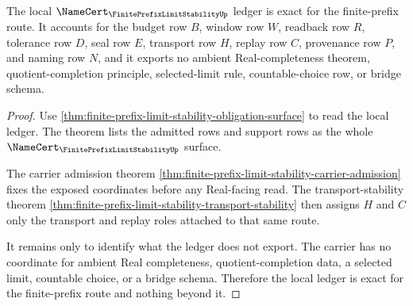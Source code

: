 \begin{theorem}
\label{thm:finite-prefix-limit-stability-ledger-exactness}
The local $\NameCert_{\FinitePrefixLimitStabilityUp}$ ledger is exact for the finite-prefix route. It accounts for the budget row $B$, window row $W$, readback row $R$, tolerance row $D$, seal row $E$, transport row $H$, replay row $C$, provenance row $P$, and naming row $N$, and it exports no ambient Real-completeness theorem, quotient-completion principle, selected-limit rule, countable-choice row, or bridge schema.
\end{theorem}
\begin{proof}
Use \autoref{thm:finite-prefix-limit-stability-obligation-surface} to read the local ledger. The theorem lists the admitted rows and support rows as the whole $\NameCert_{\FinitePrefixLimitStabilityUp}$ surface.

The carrier admission theorem \autoref{thm:finite-prefix-limit-stability-carrier-admission} fixes the exposed coordinates before any Real-facing read. The transport-stability theorem \autoref{thm:finite-prefix-limit-stability-transport-stability} then assigns $H$ and $C$ only the transport and replay roles attached to that same route.

It remains only to identify what the ledger does not export. The carrier has no coordinate for ambient Real completeness, quotient-completion data, a selected limit, countable choice, or a bridge schema. Therefore the local ledger is exact for the finite-prefix route and nothing beyond it.
\end{proof}

